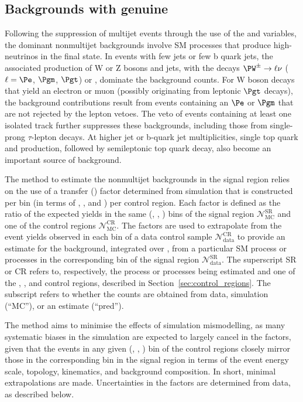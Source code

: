 \subsection{Backgrounds with genuine \texorpdfstring{\ETmiss}{MET}}
\label{sec:ewk_background}

Following the suppression of multijet events through the use of the
\alphat and \bdphi variables, the dominant nonmultijet backgrounds
involve SM processes that produce high-\pt neutrinos in the final
state. In events with few jets or few b quark jets, the associated
production of W or Z bosons and jets, with the decays $\PW^\pm
\to \ell\nu$ ($\ell=\Pe$, $\Pgm$, $\Pgt$) or \znunu,
dominate the background counts. For W boson decays that yield an
electron or muon (possibly originating from leptonic $\Pgt$ decays),
the background contributions result from events containing an $\Pe$ or
$\Pgm$ that are not rejected by the lepton vetoes.
The veto of events containing at least one isolated track further
suppresses these backgrounds, including those from single-prong
$\tau$-lepton decays. At higher jet or b-quark jet multiplicities,
single top quark and \ttbar production, followed by semileptonic top
quark decay, also become an important source of background.

The method to estimate the nonmultijet backgrounds in the signal
region relies on the use of a transfer (\tf) factor determined from
simulation that is constructed per bin (in terms of \njet, \nb, and
\scalht) per control region. Each \tf factor is defined as the ratio
of the expected yields in the same (\njet, \nb, \scalht) bins of the
signal region $\mathcal{N}^\text{SR}_\text{MC}$ and one of the control
regions $\mathcal{N}^\text{CR}_\text{MC}$.  The \tf factors are used to
extrapolate from the event yields observed in each bin of a data
control sample $\mathcal{N}^\text{CR}_\text{data}$ to provide an
estimate for the background, integrated over \HTmiss, from a
particular SM process or processes in the corresponding bin of the
signal region $\mathcal{N}^\text{SR}_\text{data}$.  The superscript SR
or CR refers to, respectively, the process or processes being
estimated and one of the \mj, \mmj, and \gj control regions, described
in Section~\ref{sec:control_regions}. The subscript refers to whether
the counts are obtained from data, simulation (``MC''), or an estimate
(``pred'').

The method aims to minimise the effects of simulation mismodelling, as
many systematic biases in the simulation are expected to largely
cancel in the \tf factors, given that the events in any given (\njet,
\nb, \scalht) bin of the control regions closely mirror those in the
corresponding bin in the signal region in terms of the event energy
scale, topology, kinematics, and background composition. In short,
minimal extrapolations are made. Uncertainties in the \tf factors are
determined from data, as described below.

